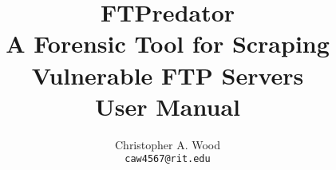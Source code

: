 \documentclass{book}
\begin{document}

\pagestyle{empty}
\title{\textbf{FTPredator} \\ A Forensic Tool for Scraping Vulnerable FTP Servers \\{\large User Manual}}
\author{Christopher A. Wood \\ {\tt caw4567@rit.edu}}
\maketitle

\pagestyle{fancy}

\tableofcontents


{}

\end{document}
